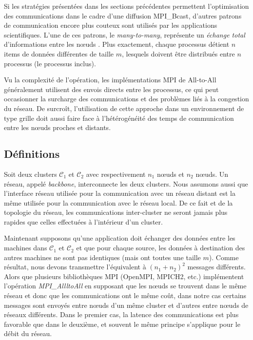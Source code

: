 Si les stratégies présentées dans les sections précédentes permettent l'optimisation des communications dans le cadre d'une diffusion MPI\_Bcast, d'autres patrons de communication encore plus couteux sont utilisés par les applications scientifiques. L'une de ces patrons, le \textit{many-to-many}, représente un \emph{échange total} d'informations entre les n{\oe}uds \cite{Christara99}. Plus exactement, chaque processus détient $n$ items de données différentes de taille $m$, lesquels doivent être distribués entre $n$ processus (le processus inclus).  

Vu la complexité de l'opération, les implémentations MPI de All-to-All généralement utilisent des envois directs entre les processus, ce qui peut occasionner la surcharge des communications et des problèmes liés à la congestion du réseau. De surcroît, l'utilisation de cette approche dans un environnement de type grille doit aussi faire face à l'hétérogénéité des temps de communication entre les n{\oe}uds proches et distants.

\subsection{Définitions}

Soit deux clusters ${\mathcal C}_1$
et ${\mathcal C}_2$ avec respectivement $n_1$ n{\oe}uds et $n_2$ n{\oe}uds.
Un réseau, appelé \textit{backbone}, interconnecte les deux clusters. Nous assumons aussi que l'interface réseau utilisée pour la communication avec un réseau distant est la même utilisée pour la communication avec le réseau local. De ce fait et de la topologie du réseau, les communications inter-cluster ne seront jamais plus rapides que celles effectuées à l'intérieur d'un cluster.

Maintenant supposons qu'une application doit échanger des données entre les machines dans ${\mathcal C}_1$ et ${\mathcal C}_2$ et que pour chaque source, les données à destination des autres machines ne sont pas identiques (mais ont toutes une taille $m$).  Comme résultat, nous devons transmettre l'équivalent à $(n_1+ n_2)^2$ messages différents. Alors que plusieurs bibliothèques MPI  (OpenMPI, MPICH2, etc.) implémentent l'opération \textit{MPI\_AllltoAll} en supposant que les n{\oe}uds se trouvent dans le même réseau et donc que les communications ont le même coût, dans notre cas certains messages sont envoyés entre n{\oe}uds d'un même cluster et d'autres entre n{\oe}uds de réseaux différents. Dans le premier cas, la latence des communications est plus favorable que dans le deuxième, et souvent le même principe s'applique pour le débit du réseau.



